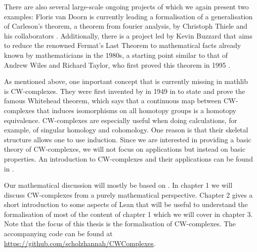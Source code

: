There are also several large-scale ongoing projects of which we again present two examples: 
Floris van Doorn is currently leading a formalisation of a generalisation of Carleson's theorem, a theorem from fourier analysis, by Christoph Thiele and his collaborators \cite{Becker2024}.
Additionally, there is a project led by Kevin Buzzard that aims to reduce the renowned Fermat's Last Theorem to mathematical facts already known by mathematicians in the 1980s, a starting point similar to that of Andrew Wiles and Richard Taylor, who first proved this theorem in 1995 \cite{Buzzard2024}.

As mentioned above, one important concept that is currently missing in mathlib is CW-complexes. 
They were first invented by  in 1949 in \cite{Whitehead2018} to state and prove the famous Whitehead theorem, which says that a continuous map between CW-complexes that induces isomorphisms on all homotopy groups is a homotopy equivalence.
CW-complexes are especially useful when doing calculations, for example, of singular homology and cohomology. 
One reason is that their skeletal structure allows one to use induction.
Since we are interested in providing a basic theory of CW-complexes, we will not focus on applications but instead on basic properties. 
An introduction to CW-complexes and their applications can be found in \cite{Lundell1969}.

Our mathematical discussion will mostly be based on \cite{Hatcher2001}.
In chapter 1 we will discuss CW-complexes from a purely mathematical perspective. 
Chapter 2 gives a short introduction to some aspects of Lean that will be useful to understand the formalisation of most of the content of chapter 1 which we will cover in chapter 3. 
Note that the focus of this thesis is the formalisation of CW-complexes. 
The accompanying code can be found at \url{https://github.com/scholzhannah/CWComplexes}.